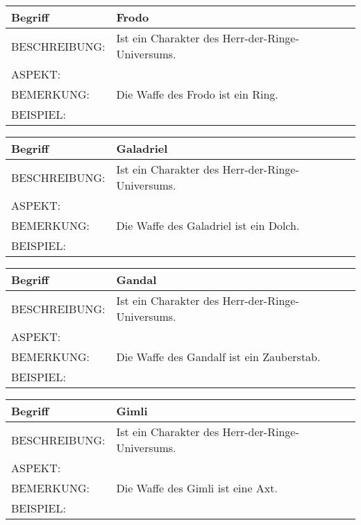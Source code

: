 \documentclass{uulm-assignment}
\begin{document}
	     \begin{tabularx}{\textwidth}{|l|X |} \hline
	        \textbf{Begriff} & \textbf{Frodo } \\
	        \hline
	        BESCHREIBUNG: & Ist ein Charakter des Herr-der-Ringe-Universums. \\
	        \hline
	        ASPEKT: &
	        \\
	        \hline
	        BEMERKUNG: & Die Waffe des Frodo ist ein Ring.\\
	        \hline
	        BEISPIEL: & \\
	        \hline
	    \end{tabularx}

	     \begin{tabularx}{\textwidth}{|l|X |} \hline
	        \textbf{Begriff} & \textbf{Galadriel } \\
	        \hline
	        BESCHREIBUNG: & Ist ein Charakter des Herr-der-Ringe-Universums. \\
	        \hline
	        ASPEKT: &
	        \\
	        \hline
	        BEMERKUNG: & Die Waffe des Galadriel ist ein Dolch.\\
	        \hline
	        BEISPIEL: & \\
	        \hline
	    \end{tabularx}

	     \begin{tabularx}{\textwidth}{|l|X |} \hline
	        \textbf{Begriff} & \textbf{Gandal} \\
	        \hline
	        BESCHREIBUNG: & Ist ein Charakter des Herr-der-Ringe-Universums. \\
	        \hline
	        ASPEKT: &
	        \\
	        \hline
	        BEMERKUNG: & Die Waffe des Gandalf ist ein Zauberstab.\\
	        \hline
	        BEISPIEL: & \\
	        \hline
	    \end{tabularx}

	     \begin{tabularx}{\textwidth}{|l|X |} \hline
	        \textbf{Begriff} & \textbf{Gimli} \\
	        \hline
	        BESCHREIBUNG: & Ist ein Charakter des Herr-der-Ringe-Universums. \\
	        \hline
	        ASPEKT: &
	        \\
	        \hline
	        BEMERKUNG: & Die Waffe des Gimli ist eine Axt. \\
	        \hline
	        BEISPIEL: & \\
	        \hline
	    \end{tabularx}
\end{document}
